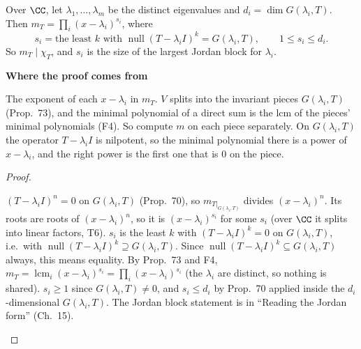 \documentclass[10pt]{scrartcl}
\DeclareMathOperator{\nul}{null}
\newenvironment{motive}{\begin{mdframed}[style=thinkbox]\textbf{\color{OliveGreen!75!black}Where the proof comes from}\begin{description}[leftmargin=0.9em,labelindent=0pt,itemsep=2pt,topsep=2pt,font=\normalfont\bfseries\color{OliveGreen!70!black}]}{\end{description}\end{mdframed}}
\newenvironment{steps}{\begin{enumerate}[label=\arabic*.,leftmargin=1.5em,itemsep=2pt,topsep=2pt]}{\end{enumerate}}
\begin{document}
\begin{proposition*}
  Over $\CC$, let $\lambda_1,\dots,\lambda_m$ be the distinct eigenvalues and $d_i=\dim G(\lambda_i,T)$. Then $m_T=\prod_i(x-\lambda_i)^{s_i}$, where
  \[ s_i=\text{the least }k\text{ with }\nul(T-\lambda_iI)^k=G(\lambda_i,T),\qquad 1\le s_i\le d_i. \]
  So $m_T\mid\chi_T$, and $s_i$ is the size of the largest Jordan block for $\lambda_i$.
\end{proposition*}
\begin{motive}
  \ii[Want.] The exponent of each $x-\lambda_i$ in $m_T$.
  \ii[Know.] $V$ splits into the invariant pieces $G(\lambda_i,T)$ (Prop.~73), and the minimal polynomial of a direct sum is the lcm of the pieces' minimal polynomials (F4).
   So compute $m$ on each piece separately. On $G(\lambda_i,T)$ the operator $T-\lambda_iI$ is nilpotent, so the minimal polynomial there is a power of $x-\lambda_i$, and the right power is the first one that is $0$ on the piece.
\end{motive}
\begin{proof}
  \begin{steps}
    \ii $(T-\lambda_iI)^n=0$ on $G(\lambda_i,T)$ (Prop.~70), so $m_{T|_{G(\lambda_i,T)}}$ divides $(x-\lambda_i)^n$. Its roots are roots of $(x-\lambda_i)^n$, so it is $(x-\lambda_i)^{s_i}$ for some $s_i$ (over $\CC$ it splits into linear factors, T6).
    \ii $s_i$ is the least $k$ with $(T-\lambda_iI)^k=0$ on $G(\lambda_i,T)$, i.e.\ with $\nul(T-\lambda_iI)^k\supseteq G(\lambda_i,T)$. Since $\nul(T-\lambda_iI)^k\subseteq G(\lambda_i,T)$ always, this means equality.
    \ii By Prop.~73 and F4, $m_T=\operatorname{lcm}_i(x-\lambda_i)^{s_i}=\prod_i(x-\lambda_i)^{s_i}$ (the $\lambda_i$ are distinct, so nothing is shared).
    \ii $s_i\ge1$ since $G(\lambda_i,T)\ne0$, and $s_i\le d_i$ by Prop.~70 applied inside the $d_i$-dimensional $G(\lambda_i,T)$. The Jordan block statement is in ``Reading the Jordan form'' (Ch.~15).
  \end{steps}
\end{proof}
\end{document}
